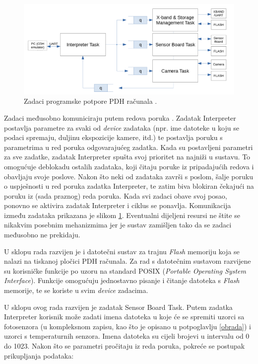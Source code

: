 \begin{figure}[htb]
    \centering
    \includegraphics[width=\textwidth]{slike/rtos_zadaci.png}
    \caption{Zadaci programske potpore PDH računala \cite{diplomski_goran_petrak}.}
    \label{fig:rtos_zadaci}
\end{figure}

Zadaci međusobno komuniciraju putem redova poruka . Zadatak Interpreter postavlja parametre za svaki od \textit{device} zadataka (npr. ime datoteke u koju se podaci spremaju, duljinu ekspozicije kamere, itd.) te postavlja poruku s parametrima u red poruka odgovarajućeg zadatka. Kada su postavljeni parametri za sve zadatke, zadatak Interpreter spušta svoj prioritet na najniži u sustavu. To omogućuje deblokadu ostalih zadataka, koji čitaju poruke iz pripadajućih redova i obavljaju svoje poslove. Nakon što neki od zadataka završi s poslom, šalje poruku o uspješnosti u red poruka zadatka Interpreter, te zatim biva blokiran čekajući na poruku iz (sada praznog) reda poruka. Kada svi zadaci obave svoj posao, ponovno se aktivira zadatak Interpreter i ciklus se ponavlja. Komunikacija između zadataka prikazana je slikom \ref{fig:rtos_zadaci}. Eventualni dijeljeni resursi ne štite se nikakvim posebnim mehanizmima jer je sustav zamišljen tako da se zadaci međusobno ne prekidaju.

U sklopu rada \cite{diplomski_goran_petrak} razvijen je i datotečni sustav za trajnu \textit{Flash} memoriju koja se nalazi na tiskanoj pločici PDH računala. Za rad s datotečnim sustavom razvijene su korisničke funkcije po uzoru na standard POSIX (\textit{Portable Operating System Interface}). Funkcije omogućuju jednostavno pisanje i čitanje datoteka s \textit{Flash} memorije, te se koriste u svim \textit{device} zadacima.

U sklopu ovog rada razvijen je zadatak Sensor Board Task. Putem zadatka Interpreter korisnik može zadati imena datoteka u koje će se spremiti uzorci sa fotosenzora (u kompleksnom zapisu, kao što je opisano u potpoglavlju \ref{obrada}) i uzorci s temperaturnih senzora. Imena datoteka su cijeli brojevi u intervalu od 0 do 1023. Nakon što se parametri pročitaju iz reda poruka, pokreće se postupak prikupljanja podataka:

